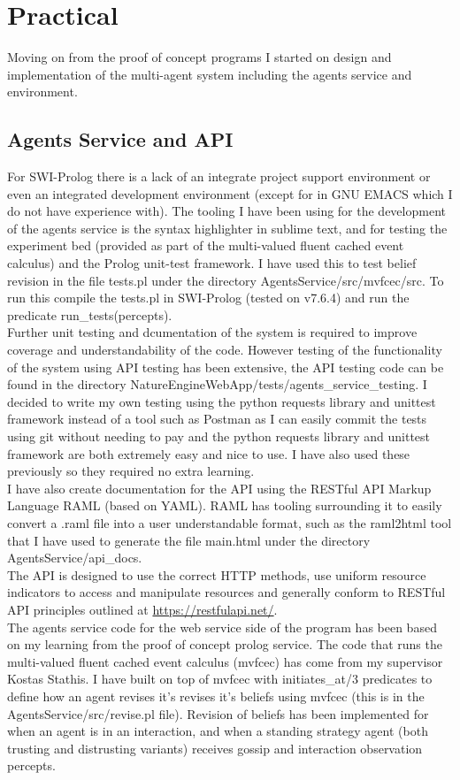 \documentclass[]{final_report}
\begin{document}
\section{Practical}
Moving on from the proof of concept programs I started on design and implementation of the multi-agent system including the agents service and environment.
\subsection{Agents Service and API}
For SWI-Prolog there is a lack of an integrate project support environment or even an integrated development environment (except for in GNU EMACS which I do not have experience with). The tooling I have been using for the development of the agents service is the syntax highlighter in sublime text, and for testing the experiment bed (provided as part of the multi-valued fluent cached event calculus) and the Prolog unit-test framework. I have used this to test belief revision in the file tests.pl under the directory AgentsService/src/mvfcec/src. To run this compile the tests.pl in SWI-Prolog (tested on v7.6.4) and run the predicate run\_tests(percepts).\\
Further unit testing and dcumentation of the system is required to improve coverage and understandability of the code. However testing of the functionality of the system using API testing has been extensive, the API testing code can be found in the directory NatureEngineWebApp/tests/agents\_service\_testing. I decided to write my own testing using the python requests library and unittest framework instead of a tool such as Postman as I can easily commit the tests using git without needing to pay and the python requests library and unittest framework are both extremely easy and nice to use. I have also used these previously so they required no extra learning.\\
I have also create documentation for the API using the RESTful API Markup Language RAML (based on YAML). RAML has tooling surrounding it to easily convert a .raml file into a user understandable format, such as the raml2html tool that I have used to generate the file main.html under the directory AgentsService/api\_docs.\\
The API is designed to use the correct HTTP methods, use uniform resource indicators to access and manipulate resources and generally conform to RESTful API principles outlined at \url{https://restfulapi.net/}.\\
The agents service code for the web service side of the program has been based on my learning from the proof of concept prolog service. The code that runs the multi-valued fluent cached event calculus (mvfcec) has come from my supervisor Kostas Stathis. I have built on top of mvfcec with initiates\_at/3 predicates to define how an agent revises it's revises it's beliefs using mvfcec (this is in the AgentsService/src/revise.pl file). Revision of beliefs has been implemented for when an agent is in an interaction, and when a standing strategy agent (both trusting and distrusting variants) receives gossip and interaction observation percepts.\\
\end{document}
